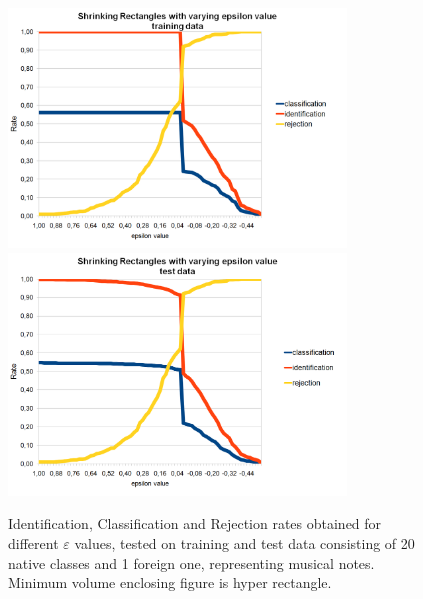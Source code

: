 \begin{figure}[htp]
	\centering
	\includegraphics[width=0.80\textwidth]{Figures/charts/MUSIC_NOTES/DIGITS_ShrinkingRectanglesToleranceTraining.png}
	\hspace{12pt}
	\includegraphics[width=0.80\textwidth]{Figures/charts/MUSIC_NOTES/DIGITS_ShrinkingRectanglesToleranceTest.png}
	\caption{ Identification, Classification and Rejection rates obtained for different $\varepsilon$ values, tested on training and test data consisting of 20 native classes and 1 foreign one, representing musical notes. Minimum volume enclosing figure is hyper rectangle. }
\end{figure}


